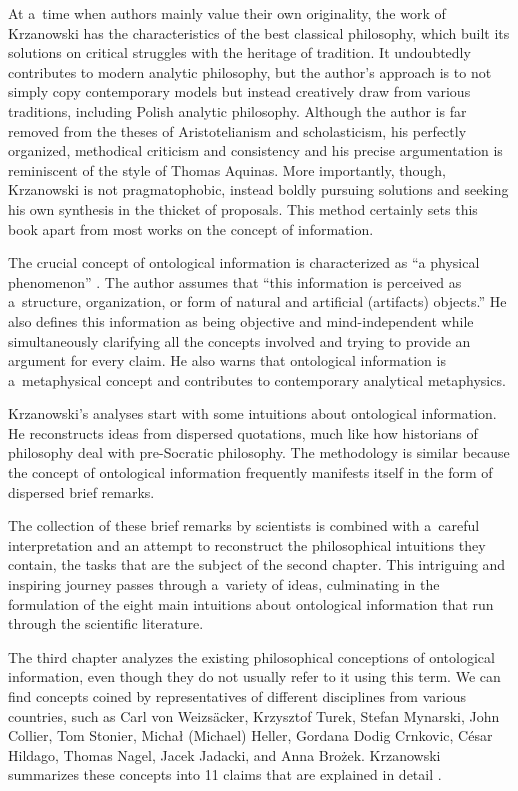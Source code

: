 At a~time when authors mainly value their own originality, the work of Krzanowski has the characteristics of the best classical philosophy, which built its solutions on critical struggles with the heritage of tradition. It undoubtedly contributes to modern analytic philosophy, but the author's approach is to not simply copy contemporary models but instead creatively draw from various traditions, including Polish analytic philosophy. Although the author is far removed from the theses of Aristotelianism and scholasticism, his perfectly organized, methodical criticism and consistency and his precise argumentation is reminiscent of the style of Thomas Aquinas. More importantly, though, Krzanowski is not pragmatophobic, instead boldly pursuing solutions and seeking his own synthesis in the thicket of proposals. This method certainly sets this book apart from most works on the concept of information.

The crucial concept of ontological information is characterized as ``a physical phenomenon''
\parencite[][p.6]{krzanowski_ontological_2022}. %
 The author assumes that ``this information is perceived as a~structure, organization, or form of natural and artificial (artifacts) objects.'' He also defines this information as being objective and mind-independent while simultaneously clarifying all the concepts involved and trying to provide an argument for every claim. He also warns that ontological information is a~metaphysical concept and contributes to contemporary analytical metaphysics.

Krzanowski's analyses start with some intuitions about ontological information. He reconstructs ideas from dispersed quotations, much like how historians of philosophy deal with pre-Socratic philosophy. The methodology is similar because the concept of ontological information frequently manifests itself in the form of dispersed brief remarks.

The collection of these brief remarks by scientists is combined with a~careful interpretation and an attempt to reconstruct the philosophical intuitions they contain, the tasks that are the subject of the second chapter. This intriguing and inspiring journey passes through a~variety of ideas, culminating in the formulation of the eight main intuitions about ontological information that run through the scientific literature.

The third chapter analyzes the existing philosophical conceptions of ontological information, even though they do not usually refer to it using this term. We can find concepts coined by representatives of different disciplines from various countries, such as Carl von Weizsäcker, Krzysztof Turek, Stefan Mynarski, John Collier, Tom Stonier, Michał (Michael) Heller, Gordana Dodig Crnkovic, César Hildago, Thomas Nagel, Jacek Jadacki, and Anna Brożek. Krzanowski summarizes these concepts into 11 claims that are explained in detail
\parencite[][pp.86–93]{krzanowski_ontological_2022}.%


